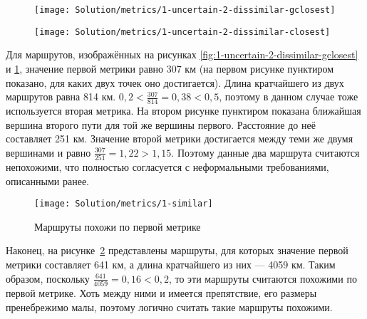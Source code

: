\begin{figure}
    \centering
    \begin{minipage}{.5\textwidth}
        \centering
        \texttt{[image: Solution/metrics/1-uncertain-2-dissimilar-gclosest]}
        \label{fig:1-uncertain-2-dissimilar-gclosest}
    \end{minipage}%
    \begin{minipage}{.5\textwidth}
        \centering
        \texttt{[image: Solution/metrics/1-uncertain-2-dissimilar-closest]}
        \label{fig:1-uncertain-2-dissimilar-closest}
    \end{minipage}
\end{figure}

Для маршрутов, изображённых на рисунках
\ref{fig:1-uncertain-2-dissimilar-gclosest} и
\ref{fig:1-uncertain-2-dissimilar-closest}, значение первой метрики
равно 307 км (на первом рисунке пунктиром показано, для каких двух
точек оно достигается). Длина кратчайшего из двух маршрутов равна 814
км. $0,2 < \frac{307}{814} = 0,38 < 0,5$, поэтому в данном случае тоже
используется вторая метрика. На втором рисунке пунктиром показана
ближайшая вершина второго пути для той же вершины первого. Расстояние
до неё составляет 251 км. Значение второй метрики достигается между
теми же двумя вершинами и равно $\frac{307}{251} = 1,22 > 1,15$. Поэтому
данные два маршрута считаются непохожими, что полностью согласуется с
неформальными требованиями, описанными ранее.

\begin{figure}
    \texttt{[image: Solution/metrics/1-similar]}
    \caption{Маршруты похожи по первой метрике}
    \label{fig:1-similar}
\end{figure}

Наконец, на рисунке~\ref{fig:1-similar} представлены маршруты, для
которых значение первой метрики составляет 641 км, а длина кратчайшего
из них --- 4059 км. Таким образом, поскольку $\frac{641}{4059} = 0,16
< 0,2$, то эти маршруты считаются похожими по первой метрике. Хоть
между ними и имеется препятствие, его размеры пренебрежимо малы,
поэтому логично считать такие маршруты похожими.

\FloatBarrier

